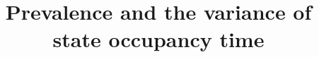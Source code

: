 \documentclass{bmcart}
\begin{document}
\begin{frontmatter}

\begin{fmbox}


\title{Prevalence and the variance of state occupancy time}


\author[
   addressref={aff1},                   %
   corref={aff1},                       %
   noteref={n1},                        %
   email={riffe@demogr.mpg.de}   %
]{ }
\author[
   addressref={aff2, aff1},
   email={williams@demogr.mpg.de }
]{ }


\address[id=aff1]{%
}
\address[id=aff2]{%
}



\end{fmbox}
\end{frontmatter}
\end{document}
